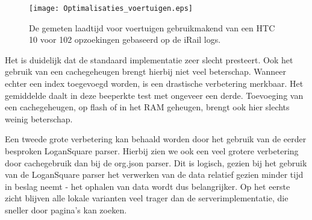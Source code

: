 \begin{figure}[h]
	\centering
	\texttt{[image: Optimalisaties\_voertuigen.eps]}
	\caption[Gemeten laadtijd voertuigen]{De gemeten laadtijd voor voertuigen gebruikmakend van een HTC 10 voor 102 opzoekingen gebaseerd op de iRail logs. }
	\label{fig:vehiclelabtest}
\end{figure}

%		
%		

Het is duidelijk dat de standaard implementatie zeer slecht presteert. Ook het gebruik van een cachegeheugen brengt hierbij niet veel beterschap. Wanneer echter een index toegevoegd worden, is een drastische verbetering merkbaar. Het gemiddelde daalt in deze beeperkte test met ongeveer een derde. Toevoeging van een cachegeheugen, op flash of in het RAM geheugen, brengt ook hier slechts weinig beterschap. 

Een tweede grote verbetering kan behaald worden door het gebruik van de eerder besproken LoganSquare parser. Hierbij zien we ook een veel grotere verbetering door cachegebruik dan bij de org.json parser. Dit is logisch, gezien bij het gebruik van de LoganSquare parser het verwerken van de data relatief gezien minder tijd in beslag neemt - het ophalen van data wordt dus belangrijker. Op het eerste zicht blijven alle lokale varianten veel trager dan de serverimplementatie, die sneller door pagina's kan zoeken.

